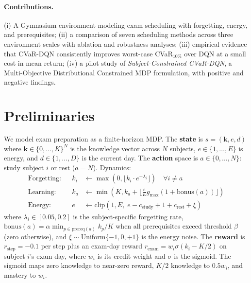 \documentclass[a4paper,11pt]{article}
\theoremstyle{definition}
\begin{document}
\paragraph{Contributions.} (i) A Gymnasium environment modeling exam scheduling with forgetting, energy, and prerequisites; (ii) a comparison of seven scheduling methods across three environment scales with ablation and robustness analyses; (iii) empirical evidence that CVaR-DQN consistently improves worst-case CVaR$_{10\%}$ over DQN at a small cost in mean return; (iv) a pilot study of \emph{Subject-Constrained CVaR-DQN}, a Multi-Objective Distributional Constrained MDP formulation, with positive and negative findings.

\section{Preliminaries}
\label{sec:problem}

We model exam preparation as a finite-horizon MDP. The \textbf{state} is $s = (\mathbf{k}, e, d)$ where $\mathbf{k} \in \{0, \ldots, K\}^N$ is the knowledge vector across $N$ subjects, $e \in \{1, \ldots, E\}$ is energy, and $d \in \{1, \ldots, D\}$ is the current day. The \textbf{action} space is $a \in \{0, \ldots, N\}$: study subject $i$ or rest ($a = N$). Dynamics:
\begin{align}
    \text{Forgetting:} && k_i &\leftarrow \max(0, \lfloor k_i \cdot e^{-\lambda_i} \rfloor) \quad \forall i \neq a \label{eq:forgetting} \\
    \text{Learning:}   && k_a &\leftarrow \min(K, k_a + \lfloor \tfrac{e}{E} g_{\max} (1 + \mathrm{bonus}(a)) \rfloor) \label{eq:learning} \\
    \text{Energy:}     && e   &\leftarrow \mathrm{clip}(1, E,\; e - c_\text{study} + 1 + c_\text{rest} + \xi)
\end{align}
where $\lambda_i \in [0.05, 0.2]$ is the subject-specific forgetting rate, $\mathrm{bonus}(a) = \alpha \min_{p \in \mathrm{prereq}(a)} k_p/K$ when all prerequisites exceed threshold $\beta$ (zero otherwise), and $\xi \sim \mathrm{Uniform}\{-1, 0, +1\}$ is the energy noise. The \textbf{reward} is $r_{\text{step}} = -0.1$ per step plus an exam-day reward $r_{\text{exam}} = w_i \sigma(k_i - K/2)$ on subject $i$'s exam day, where $w_i$ is its credit weight and $\sigma$ is the sigmoid. The sigmoid maps zero knowledge to near-zero reward, $K/2$ knowledge to $0.5 w_i$, and mastery to $w_i$.
\end{document}
